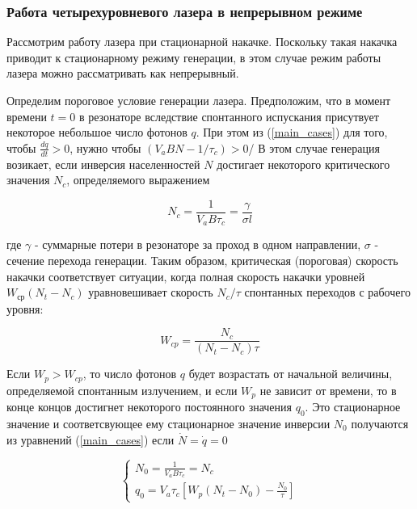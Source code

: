 \documentclass[a4paper]{article}
\begin{document}
\subsubsection{Работа четырехуровневого лазера в непрерывном режиме}

Рассмотрим работу лазера при стационарной накачке. Поскольку такая накачка приводит к стационарному режиму генерации, в этом случае режим работы лазера можно рассматривать как непрерывный.

Определим пороговое условие генерации лазера. Предположим, что в момент времени $t=0$ в резонаторе вследствие спонтанного испускания присутвует некоторое небольшое число фотонов $q$. При этом из (\ref{main_cases}) для того, чтобы $\frac{dq}{dt} > 0$, нужно чтобы $(V_a BN - 1/\tau_c) > 0$/ В этом случае генерация возикает, если инверсия населенностей $N$ достигает некоторого критического значения $N_c$, определяемого выражением

\begin{equation}
	N_c = \frac{1}{V_a B \tau_c} = \frac{\gamma}{\sigma l}
\end{equation}

где $\gamma$ - суммарные потери в резонаторе за проход в одном направлении, $\sigma$ - сечение перехода генерации. Таким образом, критическая (пороговая) скорость накачки соответствует ситуации, когда полная скорость накачки уровней $W_{\text{ср}}(N_t - N_c)$ уравновешивает скорость $N_c / \tau$ спонтанных переходов с рабочего уровня:

\begin{equation}
	W_{cp} = \frac{N_c}{(N_t - N_c) \tau}
\end{equation}

Если $W_p > W_{cp}$, то число фотонов $q$ будет возрастать от начальной величины, определяемой спонтанным излучением, и если $W_p$ не зависит от времени, то в конце концов достигнет некоторого постоянного значения $q_0$. Это стационарное значение и соответсвующее ему стационарное значение инверсии $N_0$ получаются из уравнений (\ref{main_cases}) если $\dot{N} = \dot{q} = 0$

\begin{equation}
\begin{cases}

N_0 = \frac{1}{V_a B \tau_c} = N_c \\
q_0 = V_a \tau_c [W_p(N_t - N_0) - \frac{N_0}{\tau}]

\end{cases}
\end{equation}
\end{document}

